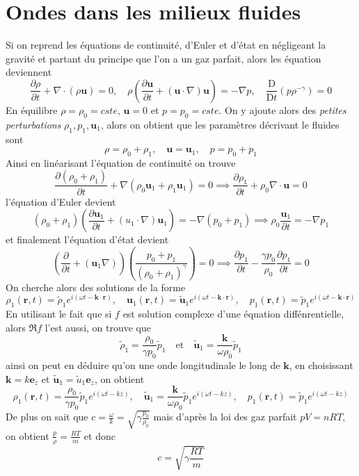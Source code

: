 \documentclass[10pt]{article}
\numberwithin{equation}{section}
\newcommand{\et}{\quad \text{et} \quad}
\begin{document}
\clearpage
\section{Ondes dans les milieux fluides}
Si on reprend les équations de continuité, d'Euler et d'état en négligeant la gravité et partant du principe que l'on a un gaz parfait, alors les équation deviennent
\[
\frac{\partial \rho}{\partial t} + \nabla \cdot (\rho \bm u) = 0, \quad \rho \left( \frac{\partial \bm u}{\partial t} + (\bm u \cdot \nabla ) \bm u \right) = - \nabla p, \quad \frac{\mathrm D}{\mathrm Dt} (p \rho^{-\gamma}) = 0
\]
En équilibre $\rho = \rho_0 = cste$, $\bm u = 0$ et $p = p_0 = cste$. On y ajoute alors des \emph{petites perturbations} $\rho_1, p_1, \bm u_1$, alors on obtient que les paramètres décrivant le fluides sont
\[
\rho = \rho_0 + \rho_1, \quad \bm u = \bm u_1, \quad p = p_0 + p_1
\]
Ainsi en linéarisant l'équation de continuité on trouve
\[
\frac{\partial(\rho_0 + \rho_1)}{\partial t} + \nabla (\rho_0 \bm u_1 + \rho_1 \bm u_1) = 0 \implies \boxed{\frac{\partial \rho_1}{\partial t} + \rho_0 \nabla \cdot \bm u = 0 }
\]
l'équation d'Euler devient
\[
(\rho_0 + \rho_1) \left( \frac{\partial \bm u_1}{\partial t} + (u_1 \cdot \nabla) \bm u_1 \right) = - \nabla (p_0 + p_1) \implies \boxed{\rho_0 \frac{\bm u_1}{\partial t} = - \nabla p_1}
\]
et finalement l'équation d'état devient
\[
\left(\frac{\partial }{\partial t} + (\bm u_1 \nabla)\right) \left( \frac{p_0 + p_1}{(\rho_0 + \rho_1)^\gamma}\right) = 0 \implies \boxed{\frac{\partial p_1}{\partial t} - \frac{\gamma p_0}{\rho_0} \frac{\partial p_1}{\partial t} = 0}
\]
On cherche alors des solutions de la forme
\[
\rho_1(\bm r, t) = \tilde \rho_1 e^{i(\omega t - \bm k \cdot \bm r)}, \quad \bm u_1(\bm r, t) = \bm{\tilde u}_1 e^{i(\omega t - \bm k \cdot \bm r)}, \quad p_1(\bm r, t) = \tilde p_1 e^{i(\omega t - \bm k \cdot \bm r)}
\]
En utilisant le fait que si $f$ est solution complexe d'une équation diffénrentielle, alors $\Re f$ l'est aussi, on trouve que
\[
\tilde \rho_1 = \frac{\rho_0}{\gamma p_0} \tilde p_1 \et \bm{\tilde u}_1 = \frac{\bm k}{\omega \rho_0} \tilde p_1
\]
ainsi on peut en déduire qu'on une onde longitudinale le long de $\bm k$, en choisissant $\bm k = k \bm e_z$ et $\bm{\tilde u}_1 = \tilde u_1 \bm e_z$, on obtient
\[
\boxed{\rho_1(\bm r,t) = \frac{\rho_0}{\gamma p_0} \tilde p_1 e^{i(\omega t - kz)}}, \quad \boxed{\bm{\tilde u}_1= \frac{\bm k}{\omega \rho_0}\tilde p_1 e^{i(\omega t -kz)}}, \quad \boxed{p_1(\bm r,t) = \tilde p_1 e^{i (\omega t - kz)}}	
\]
De plus on sait que $c = \frac{\omega}{k} = \sqrt{\gamma \frac{p_0}{\rho_0}}$ mais d'après la loi des gaz parfait $pV = nRT$, on obtient $\frac{p}{\rho} = \frac{RT}{m}$ et donc
\[
\boxed{c = \sqrt{\gamma\frac{RT}{m}}}
\]
\end{document}
